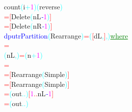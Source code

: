 {{{\rm{}count}\hsspace \textcolor{cyan}{(}{\rm{}i}\textcolor{cyan}{+}\textcolor{magenta}{1}\textcolor{cyan}{)}\hsspace \textcolor{cyan}{(}{\rm{}reverse}\textcolor{cyan}{)}\\\hsspace \textcolor{red}{=}\hsspace \hsspace \textcolor{red}{[}{\rm{}Delete}\hsspace \textcolor{cyan}{(}{\rm{}nL}\textcolor{blue}{{\it{}-}}\textcolor{magenta}{1}\textcolor{cyan}{)}\textcolor{red}{]}\\\hsspace \textcolor{red}{=}\hsspace \textcolor{red}{[}{\rm{}Delete}\hsspace \textcolor{cyan}{(}{\rm{}nR}\textcolor{blue}{{\it{}-}}\textcolor{magenta}{1}\textcolor{cyan}{)}\textcolor{red}{]}\\\textcolor{blue}{dputrPartition}\hsspace \textcolor{cyan}{(}{\rm{}Rearrange}\textcolor{cyan}{)}\hsspace \textcolor{red}{=}\hsspace \textcolor{cyan}{(}\textcolor{red}{[}{\rm{}dL}\textcolor{cyan}{,}\textcolor{red}{]}\textcolor{cyan}{,}\textcolor{cyan}{)}\hsspace \textcolor{green}{\underline{where}}\\\hsspace \hsspace \hsspace \hsspace \hsspace \hsspace \hsspace \hsspace \textcolor{red}{=}\\\hstab \textcolor{cyan}{(}{\rm{}nL}\textcolor{cyan}{,}\textcolor{cyan}{)}\hsspace \textcolor{red}{=}\hsspace \textcolor{cyan}{(}{\rm{}n}\textcolor{cyan}{+}\textcolor{magenta}{1}\textcolor{cyan}{)}\\\hsspace \hsspace \hsspace \hsspace \hsspace \hsspace \hsspace \textcolor{red}{=}\\\hsspace \hsspace \hsspace \hsspace \hsspace \hsspace \hsspace \textcolor{red}{=}\hsspace \hsspace \textcolor{red}{[}{\rm{}Rearrange}\hsspace \textcolor{cyan}{(}{\rm{}Simple}\textcolor{cyan}{)}\textcolor{red}{]}\\\hsspace \hsspace \hsspace \hsspace \hsspace \hsspace \hsspace \textcolor{red}{=}\hsspace \textcolor{red}{[}{\rm{}Rearrange}\hsspace \textcolor{cyan}{(}{\rm{}Simple}\textcolor{cyan}{)}\textcolor{red}{]}\\\hsspace \hsspace \hsspace \hsspace \hsspace \hsspace \hsspace \textcolor{red}{=}\hsspace \textcolor{cyan}{(}{\rm{}out}\hsspace \textcolor{cyan}{.}\hsspace \textcolor{cyan}{.}\hsspace \textcolor{cyan}{)}\hsspace \textcolor{red}{[}\textcolor{magenta}{1}\textcolor{red}{..}{\rm{}nL}\textcolor{blue}{{\it{}-}}\textcolor{magenta}{1}\textcolor{red}{]}\\\hsspace \hsspace \hsspace \hsspace \hsspace \hsspace \hsspace \textcolor{red}{=}\hsspace \textcolor{cyan}{(}{\rm{}out}\hsspace \textcolor{cyan}{.}\hsspace \textcolor{cyan}{.}\textcolor{cyan}{)}\hsspace }}
